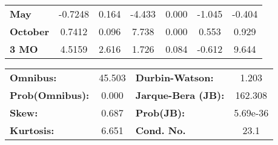 \begin{center}
\begin{tabular}{lcccccc}
\textbf{May}      &      -0.7248  &        0.164     &    -4.433  &         0.000        &       -1.045    &       -0.404     \\
\textbf{October}  &       0.7412  &        0.096     &     7.738  &         0.000        &        0.553    &        0.929     \\
\textbf{3 MO}     &       4.5159  &        2.616     &     1.726  &         0.084        &       -0.612    &        9.644     \\
\bottomrule
\end{tabular}
\begin{tabular}{lclc}
\textbf{Omnibus:}       & 45.503 & \textbf{  Durbin-Watson:     } &    1.203  \\
\textbf{Prob(Omnibus):} &  0.000 & \textbf{  Jarque-Bera (JB):  } &  162.308  \\
\textbf{Skew:}          &  0.687 & \textbf{  Prob(JB):          } & 5.69e-36  \\
\textbf{Kurtosis:}      &  6.651 & \textbf{  Cond. No.          } &     23.1  \\
\bottomrule
\end{tabular}
\end{center}

